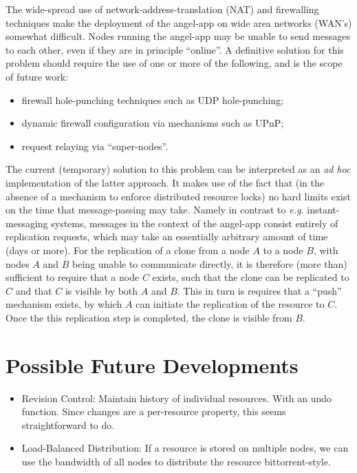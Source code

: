 \documentclass[11pt]{article}
\begin{document}
\begin{mainmatter}
The wide-spread use of network-address-translation (NAT) and firewalling techniques make the deployment of the angel-app on wide area networks (WAN's) somewhat difficult. Nodes running the angel-app may be unable to send messages to each other, even if they are in principle ``online''. A definitive solution for this problem should require the use of one or more of the following, and is the scope of future work:
\begin{itemize}
\item firewall hole-punching techniques such as UDP hole-punching;
\item dynamic firewall configuration via mechanisms such as UPnP;
\item request relaying via ``super-nodes''.
\end{itemize}
The current (temporary) solution to this problem can be interpreted as an \emph{ad hoc} implementation of the latter approach. It makes use of the fact that (in the absence of a mechanism to enforce distributed resource locks) no hard limits exist on the time that message-passing may take. Namely in contrast to \emph{e.g.} instant-messaging systems, messages in the context of the angel-app consist entirely of replication requests, which may take an essentially arbitrary amount of time (days or more). For the replication of a clone from a node $A$ to a node $B$, with nodes $A$ and $B$ being unable to communicate directly, it is therefore (more than) sufficient to require that a node $C$ exists, such that the clone can be replicated to $C$ and that $C$ is visible by both $A$ and $B$. This in turn is requires that a ``push'' mechanism exists, by which $A$ can initiate the replication of the resource to $C$. Once the this replication step is completed, the clone is visible from $B$.


\section{Possible Future Developments}

\begin{itemize}
\item Revision Control:
Maintain history of individual resources. With an undo function. Since changes are a per-resource property, this seems straightforward to do.

\item Load-Balanced Distribution:
If a resource is stored on multiple nodes, we can use the bandwidth of all nodes to distribute the resource bittorrent-style.


\end{itemize}
\end{mainmatter}
\end{document}
